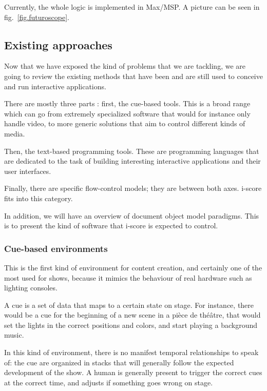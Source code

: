 \documentclass{sigchi}
\begin{document}
Currently, the whole logic is implemented in Max/MSP. A picture can be seen in fig.~\ref{fig.futuroscope}.


\subsection{Existing approaches}
Now that we have exposed the kind of problems that we are tackling, we are going to review the existing methods that have been and are still used to conceive and run interactive applications.

There are mostly three parts : first, the cue-based tools. This is a broad range which can go from extremely specialized software that would for instance only handle video, to more generic solutions that aim to control different kinds of media.

Then, the text-based programming tools. These are programming languages that are dedicated to the task of building interesting interactive applications and their user interfaces.

Finally, there are specific flow-control models; they are between both axes. i-score fits into this category.

In addition, we will have an overview of document object model paradigms. This is to present the kind of software that i-score is expected to control. %

\subsubsection{Cue-based environments}
This is the first kind of environment for content creation, and certainly one of the most used for shows, because it mimics the behaviour of real hardware such as lighting consoles.

A cue is a set of data that maps to a certain state on stage. For instance, there would be a cue for the beginning of a new scene in a pièce de théâtre, that would set the lights in the correct positions and colors, and start playing a background music.

In this kind of environment, there is no manifest temporal relationships to speak of: the cue are organized in stacks that will generally follow the expected development of the show. A human is generally present to trigger the correct cues at the correct time, and adjusts if something goes wrong on stage.
\end{document}
